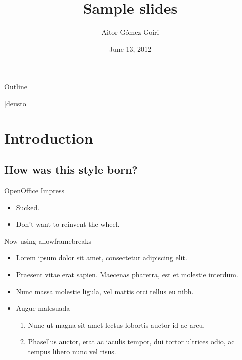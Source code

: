 \documentclass{beamer} %
\title{Sample slides}
\author{Aitor Gómez-Goiri}
\institute{DeustoTech - Deusto Institute of Technology, University of Deusto
\url{http://www.morelab.deusto.es}}
\date{June 13, 2012}
\begin{document}
  \setSubjectColor[green]
  \owntitlepage

  \begin{frame}{Outline}
    \transwipe
  \end{frame}

[deusto]
\section{Introduction}
  \subsection{How was this style born?}
  \begin{frame}{OpenOffice Impress}
    \begin{itemize}
	\item Sucked.
	\pause
	\item Don't want to reinvent the wheel.
    \end{itemize}
  \end{frame}

  \begin{frame}[allowframebreaks]{Now using allowframebreaks}
    \begin{itemize}
      \item Lorem ipsum dolor sit amet, consectetur adipiscing elit.
      \item Praesent vitae erat sapien. Maecenas pharetra, est et molestie interdum.
      \item Nunc massa molestie ligula, vel mattis orci tellus eu nibh.
      \framebreak
      \item Augue malesuada
      \begin{enumerate}
	  \item Nunc ut magna sit amet lectus lobortis auctor id ac arcu.
	  \item Phasellus auctor, erat ac iaculis tempor, dui tortor ultrices odio, ac tempus libero nunc vel risus.
	\end{enumerate}
    \end{itemize}
  \end{frame}

\end{document}
